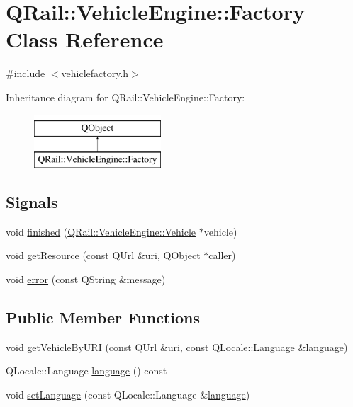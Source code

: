 \hypertarget{classQRail_1_1VehicleEngine_1_1Factory}{}\section{Q\+Rail\+::Vehicle\+Engine\+::Factory Class Reference}
\label{classQRail_1_1VehicleEngine_1_1Factory}


{\ttfamily \#include $<$vehiclefactory.\+h$>$}

Inheritance diagram for Q\+Rail\+::Vehicle\+Engine\+::Factory\+:\begin{figure}[H]
\begin{center}
\leavevmode
\includegraphics[height=2.000000cm]{classQRail_1_1VehicleEngine_1_1Factory}
\end{center}
\end{figure}
\subsection*{Signals}
\begin{DoxyCompactItemize}
\item 
void \mbox{\hyperlink{classQRail_1_1VehicleEngine_1_1Factory_a88fae81da6b6ffeb8a28ab6ca3169a00}{finished}} (\mbox{\hyperlink{classQRail_1_1VehicleEngine_1_1Vehicle}{Q\+Rail\+::\+Vehicle\+Engine\+::\+Vehicle}} $\ast$vehicle)
\item 
void \mbox{\hyperlink{classQRail_1_1VehicleEngine_1_1Factory_a1708c8ee333b8c0a8cf97acce537fb45}{get\+Resource}} (const Q\+Url \&uri, Q\+Object $\ast$caller)
\item 
void \mbox{\hyperlink{classQRail_1_1VehicleEngine_1_1Factory_af52581bd7bba4a6da7905a4fed843f29}{error}} (const Q\+String \&message)
\end{DoxyCompactItemize}
\subsection*{Public Member Functions}
\begin{DoxyCompactItemize}
\item 
void \mbox{\hyperlink{classQRail_1_1VehicleEngine_1_1Factory_aa55bf780ff5d9c9097178b9f529096c5}{get\+Vehicle\+By\+U\+RI}} (const Q\+Url \&uri, const Q\+Locale\+::\+Language \&\mbox{\hyperlink{classQRail_1_1VehicleEngine_1_1Factory_aa6e62fec814a5e6f6362062aae2eb86e}{language}})
\item 
Q\+Locale\+::\+Language \mbox{\hyperlink{classQRail_1_1VehicleEngine_1_1Factory_aa6e62fec814a5e6f6362062aae2eb86e}{language}} () const
\item 
void \mbox{\hyperlink{classQRail_1_1VehicleEngine_1_1Factory_ac3eb925f008fbe65aa63ac4e1891cbb2}{set\+Language}} (const Q\+Locale\+::\+Language \&\mbox{\hyperlink{classQRail_1_1VehicleEngine_1_1Factory_aa6e62fec814a5e6f6362062aae2eb86e}{language}})
\end{DoxyCompactItemize}
